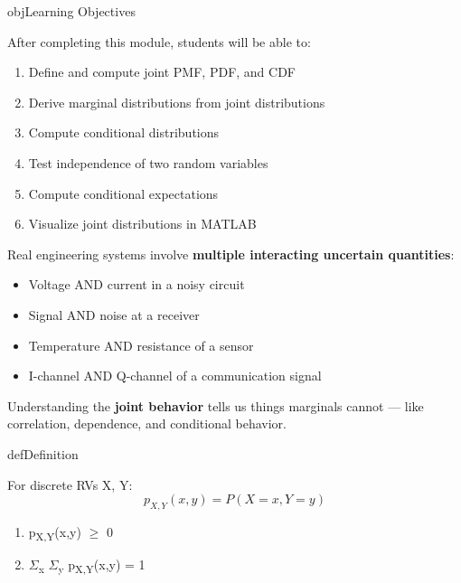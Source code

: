 \begin{PSbox}[unbreakable]{obj}{Learning Objectives}

After completing this module, students will be able to:

\begin{enumerate}
\def\labelenumi{\arabic{enumi}.}
\tightlist
\item
  Define and compute joint PMF, PDF, and CDF
\item
  Derive marginal distributions from joint distributions
\item
  Compute conditional distributions
\item
  Test independence of two random variables
\item
  Compute conditional expectations
\item
  Visualize joint distributions in MATLAB
\end{enumerate}

\end{PSbox}


Real engineering systems involve \textbf{multiple interacting uncertain quantities}:

\begin{itemize}
\tightlist
\item
  Voltage AND current in a noisy circuit
\item
  Signal AND noise at a receiver
\item
  Temperature AND resistance of a sensor
\item
  I-channel AND Q-channel of a communication signal
\end{itemize}

Understanding the \textbf{joint behavior} tells us things marginals cannot — like correlation, dependence, and conditional behavior.


\begin{PSbox}[unbreakable]{def}{Definition}

For discrete RVs X, Y:\PSbr{}\[p_{X,Y}(x,y) = P(X = x, Y = y)\]

\end{PSbox}


\begin{enumerate}
\def\labelenumi{\arabic{enumi}.}
\tightlist
\item
  p\textsubscript{X,Y}(x,y) \ensuremath{\ge} 0
\item
  \ensuremath{\Sigma}\textsubscript{x} \ensuremath{\Sigma}\textsubscript{y} p\textsubscript{X,Y}(x,y) = 1
\end{enumerate}

